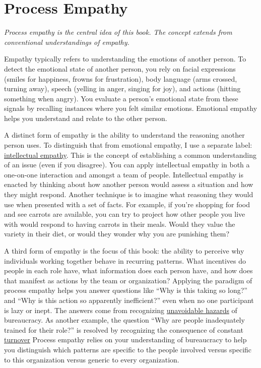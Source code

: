 \section{Process Empathy\label{sec:process-empathy}}

\textit{Process empathy is the central idea of this book. The concept extends from conventional understandings of empathy.}

Empathy typically refers to understanding the emotions of another person. To detect the emotional state of another person, you rely on facial expressions (smiles for happiness, frowns for frustration), body language (arms crossed, turning away), speech (yelling in anger, singing for joy), and actions (hitting something when angry). You evaluate a person's emotional state from these signals by recalling instances where you felt similar emotions. Emotional empathy helps you understand and relate to the other person. 

A distinct form of empathy is the ability to understand the reasoning another person uses. 
To distinguish that from emotional empathy, I use a separate label: %
\hyperref[sec:intellectual-empathy]{intellectual empathy}.
This is the concept of establishing a common understanding of an issue (even if you disagree). You can apply intellectual empathy in both a one-on-one interaction and amongst a team of people. Intellectual empathy is enacted by thinking about how another person would assess a situation and how they might respond. Another technique is to imagine what reasoning they would use when presented with a set of facts. For example, if you're shopping for food and see carrots are available, you can try to project how other people you live with would respond to having carrots in their meals. Would they value the variety in their diet, or would they wonder why you are punishing them?


A third form of empathy is the focus of this book: the ability to perceive why individuals working together behave in recurring patterns. What incentives do people in each role have, what information does each person have, and how does that manifest as actions by the team or organization? Applying the paradigm of \gls{process empathy} 
\iftoggle{glossaryinmargin}{\marginpar{[Glossary]}}{}%
helps you answer questions like ``Why is this taking so long?'' and ``Why is this action so apparently inefficient?'' even when no one participant is lazy or inept. The answers come from recognizing 
\hyperref[sec:unavoidable-hazards]{unavoidable hazards}\iftoggle{haspagenumbers}{ (see page~\pageref{sec:unavoidable-hazards})}{}
of bureaucracy. As another example, the question ``Why are people inadequately trained for their role?'' is resolved by recognizing the consequence of  constant 
\hyperref[sec:turnover]{turnover}\iftoggle{haspagenumbers}{ (see page~\pageref{sec:turnover}).}{.}
Process empathy relies on your understanding of bureaucracy to help you distinguish which patterns are specific to the people involved versus specific to this organization versus generic to every organization.

